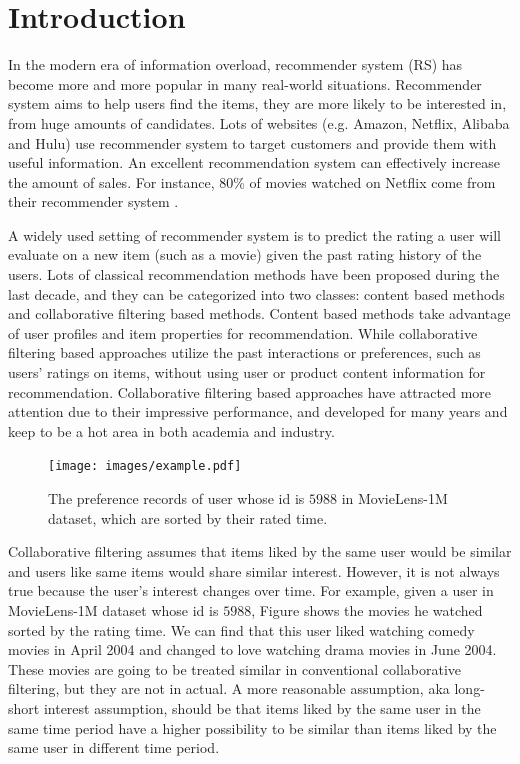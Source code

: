\documentclass{sig-alternate-05-2015}
\begin{document}

\printccsdesc


\section{Introduction}
In the modern era of information overload,
recommender system (RS) has become more and more popular in many real-world situations.
Recommender system aims to help users find the items,
they are more likely to be interested in,
from huge amounts of candidates.
Lots of websites (e.g. Amazon, Netflix, Alibaba and Hulu) use recommender system to
target customers and provide them with useful information.
An excellent recommendation system can effectively increase the amount of sales.
For instance, 80\% of movies watched on Netflix
come from their recommender system \cite{gomez2015netflix}.

A widely used setting of recommender system \cite{ricci2011introduction} is to
predict the rating a user will evaluate on a new item (such as a movie)
given the past rating history of the users.
Lots of classical recommendation methods have been proposed
during the last decade, and they can be categorized into two classes:
content based methods and collaborative filtering based methods.
Content based methods \cite{pazzani2007content} take advantage of
user profiles and item properties for recommendation.
While collaborative filtering based approaches \cite{su2009survey} utilize
the past interactions or preferences, such as users' ratings on items,
without using user or product content information for recommendation.
Collaborative filtering based approaches have attracted more attention
due to their impressive performance, and developed for many years and
keep to be a hot area in both academia and industry.

\begin{figure}[htbp]
    \centering
    \texttt{[image: images/example.pdf]}
    \caption{The preference records of user whose id is $5988$ in MovieLens-1M dataset,
    which are sorted by their rated time.}
    \label{fig:example}
\end{figure}

Collaborative filtering assumes that items liked by the same user would be similar and
users like same items would share similar interest.
However, it is not always true because the user's interest changes over time.
For example, given a user in MovieLens-1M dataset whose id is $5988$,
Figure \label{fig:example} shows the movies he watched sorted by the rating time.
We can find that this user liked watching comedy movies in April 2004 and
changed to love watching drama movies in June 2004.
These movies are going to be treated similar in conventional collaborative filtering,
but they are not in actual.
A more reasonable assumption, aka long-short interest assumption, should be that
items liked by the same user in the same time period have a higher possibility
to be similar than items liked by the same user in different time period.
\end{document}
